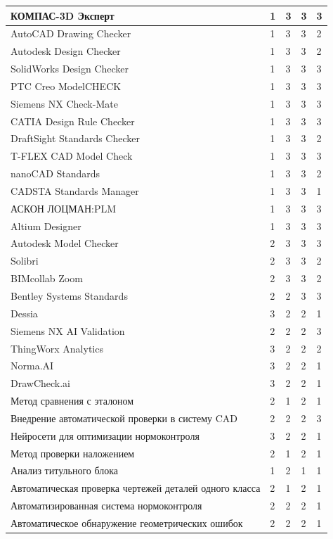 {\begin{longtable}{|p{3.85cm}|p{2.75cm}|p{2.75cm}|p{2.75cm}|p{2.75cm}|}
КОМПАС-3D Эксперт & 1 & 3 & 3 & 3 \\
\hline
AutoCAD Drawing Checker & 1 & 3 & 3 & 2 \\
\hline
Autodesk Design Checker & 1 & 3 & 3 & 2 \\
\hline
SolidWorks Design Checker & 1 & 3 & 3 & 3 \\
\hline
PTC Creo ModelCHECK & 1 & 3 & 3 & 3 \\
\hline
Siemens NX Check-Mate & 1 & 3 & 3 & 3 \\
\hline
CATIA Design Rule Checker & 1 & 3 & 3 & 3 \\
\hline
DraftSight Standards Checker & 1 & 3 & 3 & 2 \\
\hline
T-FLEX CAD Model Check & 1 & 3 & 3 & 3 \\
\hline
nanoCAD Standards & 1 & 3 & 3 & 2 \\
\hline
CADSTA Standards Manager & 1 & 3 & 3 & 1 \\
\hline
АСКОН ЛОЦМАН:PLM & 1 & 3 & 3 & 3 \\
\hline
Altium Designer & 1 & 3 & 3 & 3 \\
\hline
Autodesk Model Checker & 2 & 3 & 3 & 3 \\
\hline
Solibri & 2 & 3 & 3 & 2 \\
\hline
BIMcollab Zoom & 2 & 3 & 3 & 2 \\
\hline
Bentley Systems Standards & 2 & 2 & 3 & 3 \\
\hline
Dessia & 3 & 2 & 2 & 1 \\
\hline
Siemens NX AI Validation & 2 & 2 & 2 & 3 \\
\hline
ThingWorx Analytics & 3 & 2 & 2 & 2 \\
\hline
Norma.AI & 3 & 2 & 2 & 1 \\
\hline
DrawCheck.ai & 3 & 2 & 2 & 1 \\
\hline
Метод сравнения с эталоном & 2 & 1 & 2 & 1 \\
\hline
Внедрение автоматической проверки в систему CAD & 2 & 2 & 2 & 3 \\
\hline
Нейросети для оптимизации нормоконтроля & 3 & 2 & 2 & 1 \\
\hline
Метод проверки наложением & 2 & 1 & 2 & 1 \\
\hline
Анализ титульного блока & 1 & 2 & 1 & 1 \\
\hline
Автоматическая проверка чертежей деталей одного класса & 2 & 1 & 2 & 1 \\
\hline
Автоматизированная система нормоконтроля & 2 & 2 & 2 & 1 \\
\hline
Автоматическое обнаружение геометрических ошибок & 2 & 2 & 2 & 1 \\
\hline
\end{longtable}
}

\clearpage